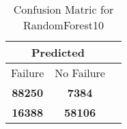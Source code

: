 \begin{table}[] 
\caption{Confusion Matric for RandomForest10} 
\label{Table: Prediction Accuracy-DMDRandomForest10OnlySunEKF-ignoreReflection-Reflection} 
\centering 
\begin{tabular} 
 {@{}ccc@{}} 
\toprule 
\multicolumn{2}{c}{\textbf{Predicted}}
 \\ \midrule 
\multicolumn{1}{|c|}{Failure} & 
\multicolumn{1}{c|}{No Failure}
 \\ \midrule 
\multicolumn{1}{|c|}{\color{green}\textbf{88250}} & 
\multicolumn{1}{c|}{\color{red}\textbf{7384}}
 \\ \midrule 
\multicolumn{1}{|c|}{\color{red}\textbf{16388}} & 
\multicolumn{1}{c|}{\color{green}\textbf{58106}}
 \\ \bottomrule 
\end{tabular} 
\end{table} 
